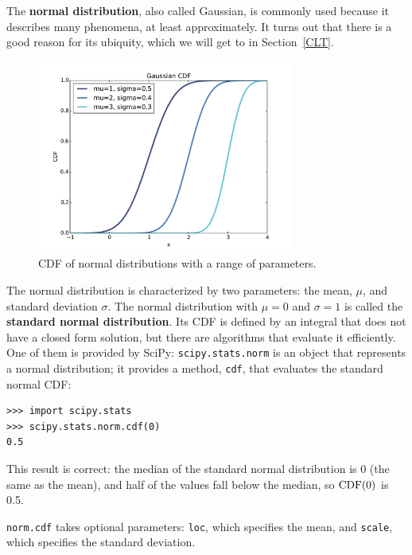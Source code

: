 \documentclass[12pt]{book}
\begin{document}
The {\bf normal distribution}, also called Gaussian, is commonly
used because it describes many phenomena, at least approximately.
It turns out that there is a good reason for its ubiquity, which we
will get to in Section~\ref{CLT}.

%
%

\begin{figure}
\centerline{\includegraphics[height=2.5in]{figs/analytic_gaussian_cdf.pdf}}
\caption{CDF of normal distributions with a range of parameters.}
\label{analytic_gaussian_cdf}
\end{figure}

The normal distribution is characterized by two parameters: the mean,
$\mu$, and standard deviation $\sigma$.  The normal distribution with
$\mu=0$ and $\sigma=1$ is called the {\bf standard normal
  distribution}.  Its CDF is defined by an integral that does not have
a closed form solution, but there are algorithms that evaluate it
efficiently.  One of them is provided by SciPy: {\tt scipy.stats.norm}
is an object that represents a normal distribution; it provides a
method, {\tt cdf}, that evaluates the standard normal CDF:

\begin{verbatim}
>>> import scipy.stats
>>> scipy.stats.norm.cdf(0)
0.5
\end{verbatim}

This result is correct: the median of the standard normal distribution
is 0 (the same as the mean), and half of the values fall below the
median, so $\mathrm{CDF}(0)$ is 0.5.

{\tt norm.cdf} takes optional parameters: {\tt loc}, which
specifies the mean, and {\tt scale}, which specifies the
standard deviation.
\end{document}
